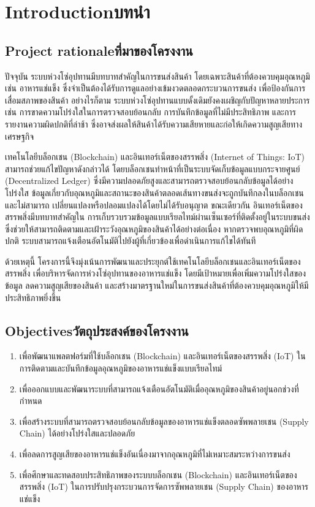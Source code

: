 \chapter{\ifenglish Introduction\else บทนำ\fi}

\section{\ifenglish Project rationale\else ที่มาของโครงงาน\fi}

\par
ปัจจุบัน ระบบห่วงโซ่อุปทานมีบทบาทสำคัญในการขนส่งสินค้า โดยเฉพาะสินค้าที่ต้องควบคุมอุณหภูมิ เช่น อาหารแช่แข็ง ซึ่งจำเป็นต้องได้รับการดูแลอย่างเข้มงวดตลอดกระบวนการขนส่ง เพื่อป้องกันการเสื่อมสภาพของสินค้า อย่างไรก็ตาม ระบบห่วงโซ่อุปทานแบบดั้งเดิมยังคงเผชิญกับปัญหาหลายประการ เช่น การขาดความโปร่งใสในการตรวจสอบย้อนกลับ การบันทึกข้อมูลที่ไม่มีประสิทธิภาพ และการรายงานความผิดปกติที่ล่าช้า ซึ่งอาจส่งผลให้สินค้าได้รับความเสียหายและก่อให้เกิดความสูญเสียทางเศรษฐกิจ

เทคโนโลยีบล็อกเชน (Blockchain) และอินเทอร์เน็ตของสรรพสิ่ง (Internet of Things: IoT)
สามารถช่วยแก้ไขปัญหาดังกล่าวได้ โดยบล็อกเชนทำหน้าที่เป็นระบบจัดเก็บข้อมูลแบบกระจายศูนย์ 
(Decentralized Ledger) ซึ่งมีความปลอดภัยสูงและสามารถตรวจสอบย้อนกลับข้อมูลได้อย่างโปร่งใส
ข้อมูลเกี่ยวกับอุณหภูมิและสถานะของสินค้าตลอดเส้นทางขนส่งจะถูกบันทึกลงในบล็อกเชน และไม่สามารถ
เปลี่ยนแปลงหรือปลอมแปลงได้โดยไม่ได้รับอนุญาต ขณะเดียวกัน อินเทอร์เน็ตของสรรพสิ่งมีบทบาทสำคัญใน
การเก็บรวบรวมข้อมูลแบบเรียลไทม์ผ่านเซ็นเซอร์ที่ติดตั้งอยู่ในระบบขนส่ง ซึ่งช่วยให้สามารถติดตามและเฝ้าระวังอุณหภูมิของสินค้าได้อย่างต่อเนื่อง หากตรวจพบอุณหภูมิที่ผิดปกติ ระบบสามารถแจ้งเตือนอัตโนมัติไปยังผู้ที่เกี่ยวข้องเพื่อดำเนินการแก้ไขได้ทันที
\par
ด้วยเหตุนี้ โครงการนี้จึงมุ่งเน้นการพัฒนาและประยุกต์ใช้เทคโนโลยีบล็อกเชนและอินเทอร์เน็ตของสรรพสิ่ง
เพื่อบริหารจัดการห่วงโซ่อุปทานของอาหารแช่แข็ง โดยมีเป้าหมายเพื่อเพิ่มความโปร่งใสของข้อมูล ลดความสูญเสียของสินค้า และสร้างมาตรฐานใหม่ในการขนส่งสินค้าที่ต้องควบคุมอุณหภูมิให้มีประสิทธิภาพยิ่งขึ้น


\section{\ifenglish Objectives\else วัตถุประสงค์ของโครงงาน\fi}
\begin{enumerate}
    \item เพื่อพัฒนาแพลตฟอร์มที่ใช้บล็อกเชน (Blockchain) และอินเทอร์เน็ตของสรรพสิ่ง (IoT) ในการติดตามและบันทึกข้อมูลอุณหภูมิของอาหารแช่แข็งแบบเรียลไทม์
    \item เพื่อออกแบบและพัฒนาระบบที่สามารถแจ้งเตือนอัตโนมัติเมื่ออุณหภูมิของสินค้าอยู่นอกช่วงที่กำหนด
    \item \sloppy เพื่อสร้างระบบที่สามารถตรวจสอบย้อนกลับข้อมูลของอาหารแช่แข็งตลอดซัพพลายเชน (Supply Chain) ได้อย่างโปร่งใสและปลอดภัย
    \item เพื่อลดการสูญเสียของอาหารแช่แข็งอันเนื่องมาจากอุณหภูมิที่ไม่เหมาะสมระหว่างการขนส่ง
    \item เพื่อศึกษาและทดสอบประสิทธิภาพของระบบบล็อกเชน (Blockchain) และอินเทอร์เน็ตของสรรพสิ่ง (IoT) ในการปรับปรุงกระบวนการจัดการซัพพลายเชน (Supply Chain) ของอาหารแช่แข็ง
\end{enumerate}

